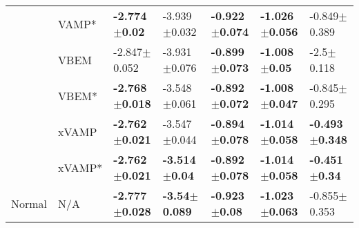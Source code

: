 \begin{tabular}{lllllll}
       & VAMP* &   \textbf{-2.774$\pm$0.02} &          -3.939$\pm$0.032 &  \textbf{-0.922$\pm$0.074} &  \textbf{-1.026$\pm$0.056} &           -0.849$\pm$0.389 \\
       & VBEM &           -2.847$\pm$0.052 &          -3.931$\pm$0.076 &  \textbf{-0.899$\pm$0.073} &   \textbf{-1.008$\pm$0.05} &             -2.5$\pm$0.118 \\
       & VBEM* &  \textbf{-2.768$\pm$0.018} &          -3.548$\pm$0.061 &  \textbf{-0.892$\pm$0.072} &  \textbf{-1.008$\pm$0.047} &           -0.845$\pm$0.295 \\
       & xVAMP &  \textbf{-2.762$\pm$0.021} &          -3.547$\pm$0.044 &  \textbf{-0.894$\pm$0.078} &  \textbf{-1.014$\pm$0.058} &  \textbf{-0.493$\pm$0.348} \\
       & xVAMP* &  \textbf{-2.762$\pm$0.021} &  \textbf{-3.514$\pm$0.04} &  \textbf{-0.892$\pm$0.078} &  \textbf{-1.014$\pm$0.058} &   \textbf{-0.451$\pm$0.34} \\
Normal & N/A &  \textbf{-2.777$\pm$0.028} &  \textbf{-3.54$\pm$0.089} &   \textbf{-0.923$\pm$0.08} &  \textbf{-1.023$\pm$0.063} &           -0.855$\pm$0.353 \\
\bottomrule
\end{tabular}

